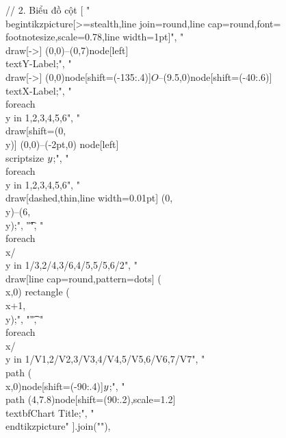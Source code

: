 // 2. Biểu đồ cột
[
"\\begin{tikzpicture}[>=stealth,line join=round,line cap=round,font=\\footnotesize,scale=0.78,line width=1pt]",
"\t\\draw[->] (0,0)--(0,7)node[left]{\\text{Y-Label}};",
"\t\\draw[->] (0,0)node[shift={(-135:.4)}]{$O$}--(9.5,0)node[shift={(-40:.6)}]{\\text{X-Label}};",
"\t\\foreach \\y in {1,2,3,4,5,6}",
"\t\\draw[shift={(0,\\y)}] (0,0)--(-2pt,0) node[left]{\\scriptsize ${\\y}$};",
"\t\\foreach \\y in {1,2,3,4,5,6}{",
	"\t\t\\draw[dashed,thin,line width=0.01pt] (0,\\y)--(6,\\y);",
	"\t}",
"\t\\foreach \\x/\\y in {1/3,2/4,3/6,4/5,5/5,6/2}",
"\t\\draw[line cap=round,pattern=dots] (\\x,0) rectangle (\\x+1,\\y);",
"\t",
"\t\\foreach \\x/\\y in {1/V1,2/V2,3/V3,4/V4,5/V5,6/V6,7/V7}",
"\t\\path (\\x,0)node[shift={(-90:.4)}]{$\\y$};",
"\t\\path (4,7.8)node[shift={(90:.2)},scale=1.2]{\\textbf{Chart Title}};",
"\\end{tikzpicture}"
].join("\n"),

